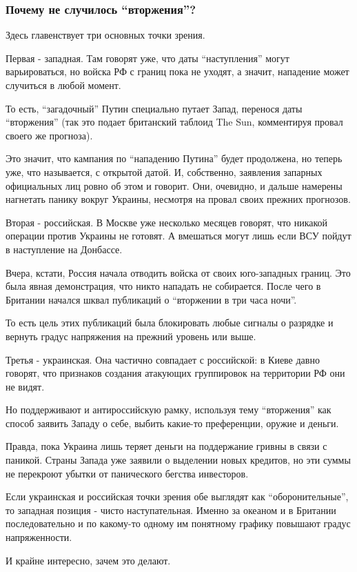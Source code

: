  
 
 
 
 

\subsubsection{Почему не случилось \enquote{вторжения}?}

Здесь главенствует три основных точки зрения. 

Первая - западная. Там говорят уже, что даты \enquote{наступления} могут
варьироваться, но войска РФ с границ пока не уходят, а значит, нападение может
случиться в любой момент.

То есть, \enquote{загадочный} Путин специально путает Запад, перенося даты
\enquote{вторжения} (так это подает британский таблоид The Sun, комментируя
провал своего же прогноза). 

Это значит, что кампания по \enquote{нападению Путина} будет продолжена, но
теперь уже, что называется, с открытой датой. И, собственно, заявления запарных
официальных лиц ровно об этом и говорит. Они, очевидно, и дальше намерены
нагнетать панику вокруг Украины, несмотря на провал своих прежних прогнозов.

Вторая - российская. В Москве уже несколько месяцев говорят, что никакой
операции против Украины не готовят. А вмешаться могут лишь если ВСУ пойдут в
наступление на Донбассе. 

Вчера, кстати, Россия начала отводить войска от своих юго-западных границ. Это
была явная демонстрация, что никто нападать не собирается. После чего в
Британии начался шквал публикаций о \enquote{вторжении в три часа ночи}. 

То есть цель этих публикаций была блокировать любые сигналы о разрядке и
вернуть градус напряжения на прежний уровень или выше. 

Третья - украинская. Она частично совпадает с российской: в Киеве давно
говорят, что признаков создания атакующих группировок на территории РФ они не
видят.

Но поддерживают и антироссийскую рамку, используя тему \enquote{вторжения} как
способ заявить Западу о себе, выбить какие-то преференции, оружие и деньги. 

Правда, пока Украина лишь теряет деньги на поддержание гривны в связи с
паникой. Страны Запада уже заявили о выделении новых кредитов, но эти суммы не
перекроют убытки от панического бегства инвесторов. 

Если украинская и российская точки зрения обе выглядят как
\enquote{оборонительные}, то западная позиция - чисто наступательная. Именно за
океаном и в Британии последовательно и по какому-то одному им понятному графику
повышают градус напряженности. 

И крайне интересно, зачем это делают. 
